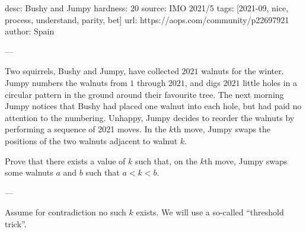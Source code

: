 desc: Bushy and Jumpy
hardness: 20
source: IMO 2021/5
tags: [2021-09, nice, process, understand, parity, bet]
url: https://aops.com/community/p22697921
author: Spain

---

Two squirrels, Bushy and Jumpy, have collected $2021$ walnuts for the winter.
Jumpy numbers the walnuts from $1$ through $2021$, and digs $2021$ little holes
in a circular pattern in the ground around their favourite tree.
The next morning Jumpy notices that Bushy had placed one walnut into each hole,
but had paid no attention to the numbering.
Unhappy, Jumpy decides to reorder the walnuts by performing a sequence of 2021 moves.
In the $k$th move, Jumpy swaps the positions of the two walnuts adjacent to walnut $k$.

Prove that there exists a value of $k$ such that, on the $k$th move,
Jumpy swaps some walnuts $a$ and $b$ such that $a<k<b$.

---

Assume for contradiction no such $k$ exists.
We will use a so-called ``threshold trick''.

